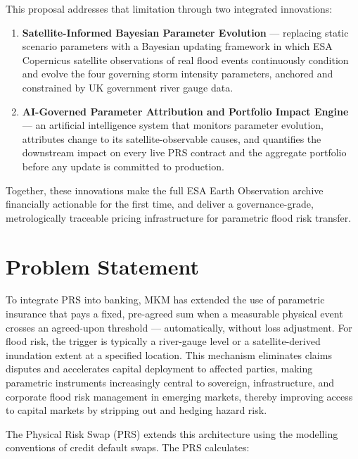 \documentclass[11pt,a4paper]{article}
\begin{document}
This proposal addresses that limitation through two integrated innovations:

\begin{enumerate}
  \item \textbf{Satellite-Informed Bayesian Parameter Evolution} --- replacing
  static scenario parameters with a Bayesian updating framework in which ESA
  Copernicus satellite observations of real flood events continuously condition
  and evolve the four governing storm intensity parameters, anchored and
  constrained by UK government river gauge data.

  \item \textbf{AI-Governed Parameter Attribution and Portfolio Impact Engine}
  --- an artificial intelligence system that monitors parameter evolution,
  attributes change to its satellite-observable causes, and quantifies the
  downstream impact on every live PRS contract and the aggregate portfolio before
  any update is committed to production.
\end{enumerate}

Together, these innovations make the full ESA Earth Observation archive
financially actionable for the first time, and deliver a governance-grade,
metrologically traceable pricing infrastructure for parametric flood risk
transfer.

\section{Problem Statement}

To integrate PRS into banking, MKM has extended the use of parametric insurance
that pays a fixed, pre-agreed sum when a measurable physical event crosses an
agreed-upon threshold --- automatically, without loss adjustment. For flood risk,
the trigger is typically a river-gauge level or a satellite-derived inundation
extent at a specified location. This mechanism eliminates claims disputes and
accelerates capital deployment to affected parties, making parametric instruments
increasingly central to sovereign, infrastructure, and corporate flood risk
management in emerging markets, thereby improving access to capital markets by
stripping out and hedging hazard risk.

The Physical Risk Swap (PRS) extends this architecture using the modelling
conventions of credit default swaps. The PRS calculates:
\end{document}
